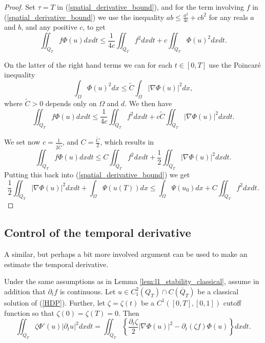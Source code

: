 \documentclass[11pt, a4paper]{article}
\begin{document}
\begin{proof}
Set $\tau=T$ in (\ref{spatial_derivative_bound}), and for the term involving $f$ in (\ref{spatial_derivative_bound}) we use the inequality $ab \leq \frac{a^2}{4c} + cb^2$ for any reals $a$ and $b$, and any positive $c$, to get
\begin{equation*}
\iint_{Q_T}f\Phi(u) dxdt \leq \frac{1}{4c}\iint_{Q_T}f^2dxdt + c\iint_{Q_T}\Phi(u)^2 dxdt.
\end{equation*}

On the latter of the right hand terms we can for each $t \in [0,T]$ use the Poincaré inequality
\begin{equation*}
\int_\Omega \Phi(u)^2 dx \leq \tilde{C}\int_\Omega |\nabla \Phi(u) |^2 dx,
\end{equation*}
where $\tilde{C}>0$ depends only on $\Omega$ and $d$. We then have
\begin{equation*}
\iint_{Q_T} f\Phi(u)dxdt \leq \frac{1}{4c}\iint_{Q_T}f^2dxdt + c\tilde{C}\iint_{Q_T}|\nabla \Phi(u)|^2dxdt. 
\end{equation*}

We set now $c = \frac{1}{2\tilde{C}}$, and $C= \frac{\tilde{C}}{2}$, which results in
\begin{equation*}
\iint_{Q_T}f\Phi(u)dxdt \leq C\iint_{Q_T}f^2dxdt + \frac{1}{2}\iint_{Q_T}|\nabla \Phi(u)|^2dxdt.
\end{equation*}
Putting this back into (\ref{spatial_derivative_bound}) we get
\begin{equation}
\frac{1}{2}\iint_{Q_T}|\nabla \Phi(u)|^2dxdt + \int_\Omega \Psi(u(T))dx \leq \int_\Omega \Psi(u_0)dx + C\iint_{Q_T}f^2dxdt.
\end{equation}
\end{proof}


\subsection{Control of the temporal derivative}
A similar, but perhaps a bit more involved argument can be used to make an estimate the temporal derivative.

\begin{lemma}
\label{lem:temporal_bound_classical}
Under the same assumptions as in Lemma \ref{lem:l1_stability_classical}, assume in addition that $\partial_t f$ is continuous. Let $u\in C^2_1(Q_T) \cap C(\overline{Q}_T)$ be a classical solution of (\ref{HDP}). Further, let $\zeta = \zeta(t)$ be a $C^1([0,T],[0,1])$ cutoff function so that $\zeta(0) = \zeta(T) = 0$. Then
\begin{equation}
\label{temporal_bound_classical}
\iint_{Q_T} \zeta \Phi'(u) |\partial_t u|^2 dxdt = \iint_{Q_T} \left\{ \frac{\partial_t \zeta}{2}|\nabla \Phi(u)|^2 - \partial_t(\zeta f) \Phi(u) \right\} dxdt.
\end{equation}
\end{lemma}
\end{document}
